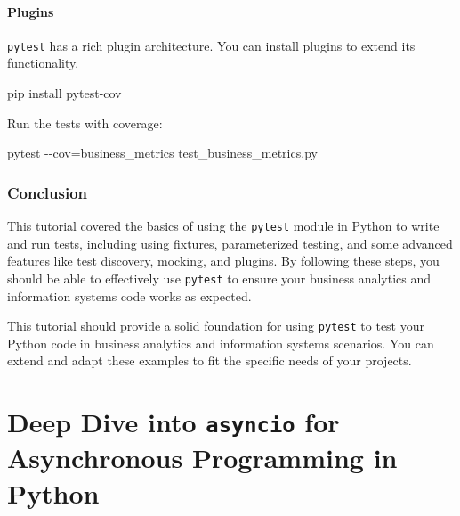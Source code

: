 \documentclass[
  letterpaper,
  DIV=11,
  numbers=noendperiod]{scrreprt}
\newenvironment{Shaded}{\begin{snugshade}}{\end{snugshade}}
\newcommand{\AttributeTok}[1]{\textcolor[rgb]{0.40,0.45,0.13}{#1}}
\newcommand{\ExtensionTok}[1]{\textcolor[rgb]{0.00,0.23,0.31}{#1}}
\newcommand{\NormalTok}[1]{\textcolor[rgb]{0.00,0.23,0.31}{#1}}
\newcommand{\OperatorTok}[1]{\textcolor[rgb]{0.37,0.37,0.37}{#1}}
\begin{document}
\subsubsection{Plugins}\label{plugins}

\texttt{pytest} has a rich plugin architecture. You can install plugins
to extend its functionality.

\begin{Shaded}
\begin{Highlighting}[]
\ExtensionTok{pip}\NormalTok{ install pytest{-}cov}
\end{Highlighting}
\end{Shaded}

Run the tests with coverage:

\begin{Shaded}
\begin{Highlighting}[]
\ExtensionTok{pytest} \AttributeTok{{-}{-}cov}\OperatorTok{=}\NormalTok{business\_metrics test\_business\_metrics.py}
\end{Highlighting}
\end{Shaded}

\subsection{Conclusion}\label{conclusion-24}

This tutorial covered the basics of using the \texttt{pytest} module in
Python to write and run tests, including using fixtures, parameterized
testing, and some advanced features like test discovery, mocking, and
plugins. By following these steps, you should be able to effectively use
\texttt{pytest} to ensure your business analytics and information
systems code works as expected.

This tutorial should provide a solid foundation for using
\texttt{pytest} to test your Python code in business analytics and
information systems scenarios. You can extend and adapt these examples
to fit the specific needs of your projects.


\chapter{\texorpdfstring{Deep Dive into \texttt{asyncio} for
Asynchronous Programming in
Python}{Deep Dive into asyncio for Asynchronous Programming in Python}}\label{deep-dive-into-asyncio-for-asynchronous-programming-in-python}
\end{document}
